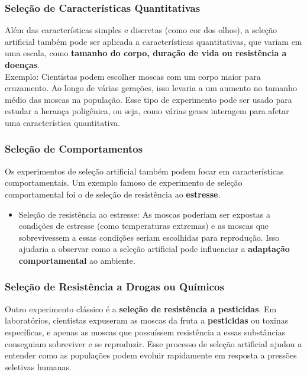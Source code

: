 \documentclass{report}
\begin{document}
\subsubsection{Seleção de Características Quantitativas}\label{subsubsec.cont1.2.3}

Além das características simples e discretas (como cor dos olhos), a seleção artificial também pode ser aplicada a características quantitativas, que variam em uma escala, como \textbf{tamanho do corpo, duração de vida ou resistência a doenças}.\\
Exemplo: Cientistas podem escolher moscas com um corpo maior para cruzamento. Ao longo de várias gerações, isso levaria a um aumento no tamanho médio das moscas na população. Esse tipo de experimento pode ser usado para estudar a herança poligênica, ou seja, como várias genes interagem para afetar uma característica quantitativa.

\subsubsection{Seleção de Comportamentos}\label{subsubsec.cont1.2.4}

Os experimentos de seleção artificial também podem focar em características comportamentais. Um exemplo famoso de experimento de seleção comportamental foi o de seleção de resistência ao \textbf{estresse}.\\

\begin{itemize}
 \item Seleção de resistência ao estresse: As moscas poderiam ser expostas a condições de estresse (como temperaturas extremas) e as moscas que sobrevivessem a essas condições seriam escolhidas para reprodução. Isso ajudaria a observar como a seleção artificial pode influenciar a \textbf{adaptação comportamental} ao ambiente.
\end{itemize}

\subsubsection{Seleção de Resistência a Drogas ou Químicos}\label{subsubsec.cont1.2.5}

Outro experimento clássico é a \textbf{seleção de resistência a pesticidas}. Em laboratórios, cientistas expuseram as moscas da fruta a \textbf{pesticidas} ou toxinas específicas, e apenas as moscas que possuíssem resistência a essas substâncias conseguiam sobreviver e se reproduzir. Esse processo de seleção artificial ajudou a entender como as populações podem evoluir rapidamente em resposta a pressões seletivas humanas.
\end{document}

